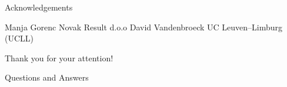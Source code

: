 \begin{frame}{Acknowledgements}
\begin{outline}
    \1[] Manja Gorenc Novak
    \1[] Result d.o.o
    \vspace{0.3cm}
    \1[] David Vandenbroeck
    \1[] UC Leuven--Limburg (UCLL)
\end{outline}
\end{frame}

\begin{frame}
\centering
\large
Thank you for your attention!
\end{frame}

\begin{frame}
    \centering
    \large
    Questions and Answers
\end{frame}
